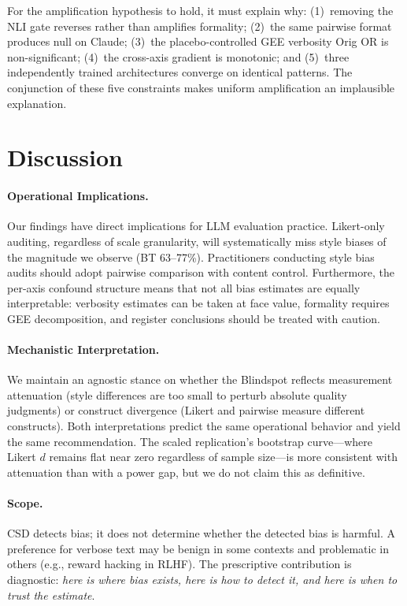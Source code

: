 \documentclass[11pt,twocolumn]{article}
\begin{document}
For the amplification hypothesis to hold, it must explain why: (1)~removing the NLI gate reverses rather than amplifies formality; (2)~the same pairwise format produces null on Claude; (3)~the placebo-controlled GEE verbosity Orig OR is non-significant; (4)~the cross-axis gradient is monotonic; and (5)~three independently trained architectures converge on identical patterns. The conjunction of these five constraints makes uniform amplification an implausible explanation.

\section{Discussion}
\label{sec:discussion}

\paragraph{Operational Implications.}
Our findings have direct implications for LLM evaluation practice. Likert-only auditing, regardless of scale granularity, will systematically miss style biases of the magnitude we observe (BT 63--77\%). Practitioners conducting style bias audits should adopt pairwise comparison with content control. Furthermore, the per-axis confound structure means that not all bias estimates are equally interpretable: verbosity estimates can be taken at face value, formality requires GEE decomposition, and register conclusions should be treated with caution.

\paragraph{Mechanistic Interpretation.}
We maintain an agnostic stance on whether the Blindspot reflects measurement attenuation (style differences are too small to perturb absolute quality judgments) or construct divergence (Likert and pairwise measure different constructs). Both interpretations predict the same operational behavior and yield the same recommendation. The scaled replication's bootstrap curve---where Likert $d$ remains flat near zero regardless of sample size---is more consistent with attenuation than with a power gap, but we do not claim this as definitive.

\paragraph{Scope.}
CSD detects bias; it does not determine whether the detected bias is harmful. A preference for verbose text may be benign in some contexts and problematic in others (e.g., reward hacking in RLHF). The prescriptive contribution is diagnostic: \emph{here is where bias exists, here is how to detect it, and here is when to trust the estimate}.
\end{document}
